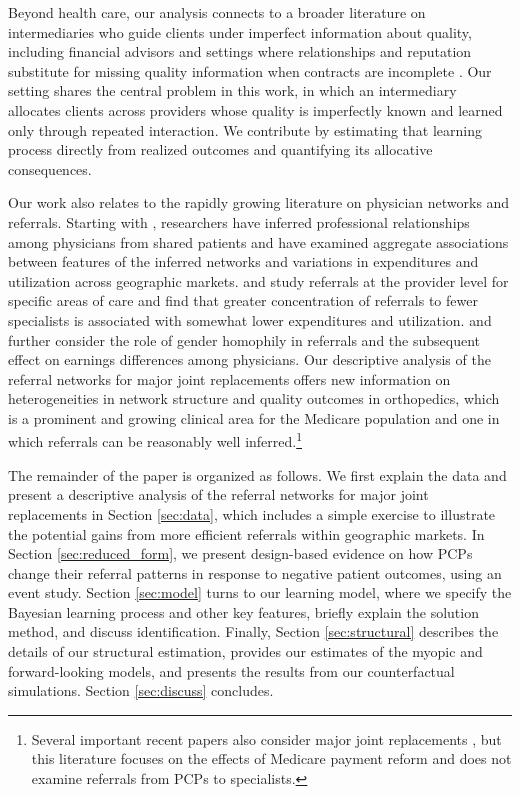\documentclass[12pt]{article}
\begin{document}
Beyond health care, our analysis connects to a broader literature on intermediaries who guide clients under imperfect information about quality, including financial advisors \citep{gennaioli2015, egan2019} and settings where relationships and reputation substitute for missing quality information when contracts are incomplete \citep{banerjee2000, macchiavello2015}. Our setting shares the central problem in this work, in which an intermediary allocates clients across providers whose quality is imperfectly known and learned only through repeated interaction. We contribute by estimating that learning process directly from realized outcomes and quantifying its allocative consequences.

Our work also relates to the rapidly growing literature on physician networks and referrals. Starting with \cite{barnett2011}, researchers have inferred professional relationships among physicians from shared patients and have examined aggregate associations between features of the inferred networks and variations in expenditures and utilization across geographic markets. \cite*{kaur2016} and \cite*{agha2022ms} study referrals at the provider level for specific areas of care and find that greater concentration of referrals to fewer specialists is associated with somewhat lower expenditures and utilization. \cite{zeltzer2020} and \cite{sarsons2023} further consider the role of gender homophily in referrals and the subsequent effect on earnings differences among physicians. Our descriptive analysis of the referral networks for major joint replacements offers new information on heterogeneities in network structure and quality outcomes in orthopedics, which is a prominent and growing clinical area for the Medicare population and one in which referrals can be reasonably well inferred.\footnote{Several important recent papers also consider major joint replacements \citep*[e.g.,][]{einav2020, einav2022}, but this literature focuses on the effects of Medicare payment reform and does not examine referrals from PCPs to specialists.}

The remainder of the paper is organized as follows. We first explain the data and present a descriptive analysis of the referral networks for major joint replacements in Section \ref{sec:data}, which includes a simple exercise to illustrate the potential gains from more efficient referrals within geographic markets. In Section \ref{sec:reduced_form}, we present design-based evidence on how PCPs change their referral patterns in response to negative patient outcomes, using an event study. Section \ref{sec:model} turns to our learning model, where we specify the Bayesian learning process and other key features, briefly explain the solution method, and discuss identification. Finally, Section \ref{sec:structural} describes the details of our structural estimation, provides our estimates of the myopic and forward-looking models, and presents the results from our counterfactual simulations. Section \ref{sec:discuss} concludes.
\end{document}
